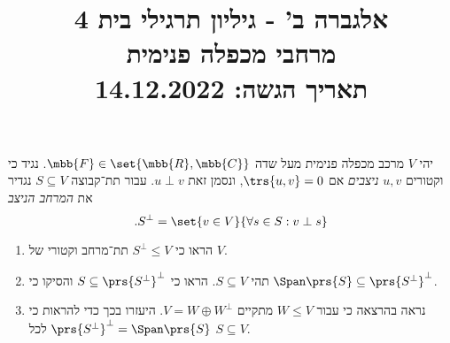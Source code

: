 \documentclass[a4paper,10pt,twoside,openany]{article}
\title{
אלגברה ב' - גיליון תרגילי בית 4 \\
מרחבי מכפלה פנימית
\\
\vspace{1cm}
\large{תאריך הגשה: 14.12.2022}
}
\date{}
\begin{document}
\maketitle

\begin{exercise}
יהי
$V$
מרכב מכפלה פנימית מעל שדה
$\mbb{F} \in \set{\mbb{R}, \mbb{C}}$.
נגיד כי וקטורים
$u,v$
\emph{ניצבים}
אם
$\trs{u,v} = 0$,
ונסמן זאת
$u \perp v$.
עבור תת־קבוצה
$S \subseteq V$
נגדיר את
\emph{המרחב הניצב}
\[\text{.} S^\perp = \set{v \in V}{\forall s \in S : v \perp s}\]

\begin{enumerate}
\item הראו כי
$S^\perp \leq V$
תת־מרחב וקטורי של
$V$.

\item תהי
$S \subseteq V$.
הראו כי
$S \subseteq \prs{S^{\perp}}^{\perp}$
והסיקו כי
$\Span\prs{S} \subseteq \prs{S^{\perp}}^{\perp}$.

\item
נראה בהרצאה כי עבור
$W \leq V$
מתקיים
$V = W \oplus W^\perp$.
היעזרו בכך כדי להראות כי
$\prs{S^\perp}^\perp = \Span\prs{S}$
לכל
$S \subseteq V$.
\end{enumerate}
\end{exercise}
\end{document}
